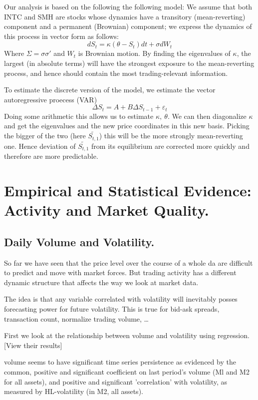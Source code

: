 \documentclass[11pt,a4paper]{article}
\theoremstyle{definition}
\theoremstyle{plain}
\theoremstyle{remark}
\newcommand{\1}{\mathbbm{1}}
\begin{document}
Our analysis is based on the following the following model: We assume that both INTC and SMH 
are stocks whose dynamics have a transitory (mean-reverting) component and a permanent (Brownian) component; 
we express the dynamics of this process in vector form as follows: 
$$dS_t = \kappa (\theta - S_t) dt + \sigma d W_t$$
Where $\Sigma = \sigma \sigma'$ and $W_t$ is Brownian motion. 
By finding the eigenvalues of $\kappa$, the largest (in absolute terms) will have the strongest exposure to 
the mean-reverting process, and hence should contain the most trading-relevant information. 

To estimate the discrete version of the model, we estimate the vector autoregressive proecess (VAR) 
$$\Delta S_t = A + B \Delta S_{t-1} + \varepsilon_t$$
Doing some arithmetic this allows us to estimate $\kappa, \ \theta$. We can then diagonalize $\kappa$ 
and get the eigenvalues and the new price coordinates in this new basis.
Picking the bigger of the two (here $\tilde{S_{t,1}}$) this will be the more strongly mean-reverting one. 
Hence deviation of $\tilde{S_{t,1}}$ from its equilibrium are corrected more quickly and therefore are more 
predictable. 

\section{Empirical and Statistical Evidence: Activity and Market Quality.} 

\subsection{Daily Volume and Volatility.} 
So far we have seen that the price level over the course of a whole da are difficult to predict and move with market forces. 
But trading activity has a different dynamic structure that affects the way we look at market data.

The idea is that any variable correlated with volatility will inevitably posses forecasting power for future volatility. 
This is true for bid-ask spreads, transaction count, normalize trading volume, \dots 

First we look at the relationship between volume and volatility using regression. 
[View their results]

volume seems 
to have significant time series persistence as evidenced by the common, positive 
and significant coefficient on last period's volume (Ml and M2 for all assets), and 
positive and significant 'correlation' with volatility, as measured by HL-volatility 
(in M2, all assets).
\end{document}

